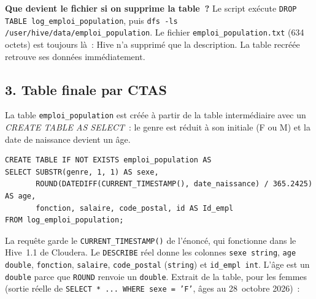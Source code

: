 \noindent \textbf{Que devient le fichier si on supprime la table~?} Le script exécute \texttt{DROP TABLE log\_emploi\_population}, puis \texttt{dfs -ls /user/hive/data/emploi\_population}. Le fichier \texttt{emploi\_population.txt} (634 octets) est toujours là~: Hive n'a supprimé que la description. La table recréée retrouve ses données immédiatement.

\subsection*{3. Table finale par CTAS}
{}

\noindent La table \texttt{emploi\_population} est créée à partir de la table intermédiaire avec un \textit{CREATE TABLE AS SELECT}~: le genre est réduit à son initiale (F ou M) et la date de naissance devient un âge.

\begin{verbatim}
CREATE TABLE IF NOT EXISTS emploi_population AS
SELECT SUBSTR(genre, 1, 1) AS sexe,
       ROUND(DATEDIFF(CURRENT_TIMESTAMP(), date_naissance) / 365.2425) AS age,
       fonction, salaire, code_postal, id AS Id_empl
FROM log_emploi_population;
\end{verbatim}

\noindent La requête garde le \texttt{CURRENT\_TIMESTAMP()} de l'énoncé, qui fonctionne dans le Hive~1.1 de Cloudera. Le \texttt{DESCRIBE} réel donne les colonnes \texttt{sexe string}, \texttt{age double}, \texttt{fonction}, \texttt{salaire}, \texttt{code\_postal} (\texttt{string}) et \texttt{id\_empl int}. L'âge est un \texttt{double} parce que \texttt{ROUND} renvoie un \texttt{double}. Extrait de la table, pour les femmes (sortie réelle de \texttt{SELECT * ... WHERE sexe = 'F'}, âges au 28~octobre 2026)~:

